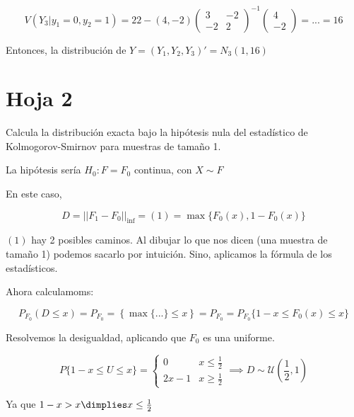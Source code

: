 \begin{problem}[7]
\[
V(Y_3|y_1=0,y_2=1) = 22 - (4,-2) \begin{pmatrix} 3&-2\\-2&2 \end{pmatrix}^{-1} \begin{pmatrix}4\\-2\end{pmatrix} = ... = 16
\]


Entonces, la distribución de $Y = (Y_1,Y_2,Y_3)' = N_3(1,16)$

\end{problem}

\section{Hoja 2}


\begin{problem}[1] Calcula la distribución exacta bajo la hipótesis nula del estadístico de Kolmogorov-Smirnov para muestras de tamaño 1.

\solution

La hipótesis sería $H_0 : F = F_0$ continua, con $X \sim F$

En este caso,

\[D=||F_1 - F_0||_{\inf} = (1) = \max\{F_0(x), 1 - F_0(x)\}\]

$(1)$ hay 2 posibles caminos. Al dibujar lo que nos dicen (una muestra de tamaño 1) podemos sacarlo por intuición. Sino, aplicamos la fórmula de los estadísticos.

Ahora calculamoms:

\[ P_{F_0}(D\leq x) = P_{F_0} = \left\{\max \{ ... \}\leq x\right\} = P_{F_0} = P_{F_0}\{ 1-x \leq F_0(x) \leq x \}\]

Resolvemos la desigualdad, aplicando que $F_0$ es una uniforme.

\[
P\{1-x \leq U \leq x\} = \left\{ \begin{array}{cc} 0 & x\leq \frac{1}{2} \\ 2x-1 & x\geq \frac{1}{2}\end{array} \right. \implies D \sim \mathcal{U}\left(\frac{1}{2},1\right)
\]

Ya que $1-x > x \dimplies x\le \frac{1}{2}$

\end{problem}
